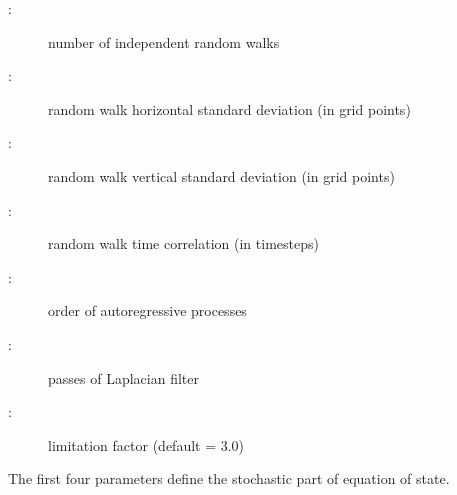 \documentclass[../main/NEMO_manual]{subfiles}
\begin{document}
\begin{description}
\item [{:}]     number of independent random walks
\item [{:}] random walk horizontal standard deviation
  (in grid points)
\item [{:}]   random walk vertical standard deviation
  (in grid points)
\item [{:}]   random walk time correlation (in timesteps)
\item [{:}]     order of autoregressive processes
\item [{:}]     passes of Laplacian filter
\item [{:}]     limitation factor (default = 3.0)
\end{description}

The first four parameters define the stochastic part of equation of state.

\subinc{}
\end{document}
